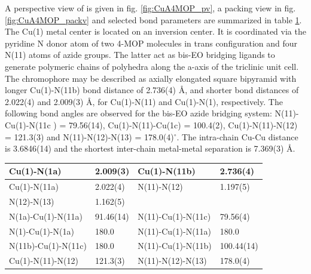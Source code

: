 A perspective view of  is given in fig. \ref{fig:CuA4MOP_pv}, a packing view in fig. \ref{fig:CuA4MOP_packv} and selected bond parameters are summarized in table \ref{batab:CuA4MOP}. The Cu(1) metal center is located on an inversion center. It is coordinated via the pyridine N donor atom of two 4-MOP molecules in trans configuration and four N(11) atoms of azide groups. The latter act as bis-EO bridging ligands to generate polymeric chains of polyhedra along the a-axis of the triclinic unit cell. The  chromophore may be described as axially elongated square bipyramid with longer Cu(1)-N(11b) bond distance of 2.736(4) \AA, and shorter bond distances of 2.022(4) and 2.009(3) \AA, for Cu(1)-N(11) and Cu(1)-N(1), respectively. The following bond angles are observed for the bis-EO azide bridging system: N(11)-Cu(1)-N(11c ) = 79.56(14), Cu(1)-N(11)-Cu(1c) = 100.4(2), Cu(1)-N(11)-N(12) = 121.3(3) and N(11)-N(12)-N(13) = 178.0(4)$^\circ$. The intra-chain Cu-Cu distance is 3.6846(14) and the shortest inter-chain metal-metal separation is 7.369(3) \AA.
\renewcommand{\arraystretch}{1.3}

\begin{table}[ htpb!]
\centering
{}
\begin{tabular}{|l|l|l|l|}
\hline
Cu(1)-N(1a) & 2.009(3) & Cu(1)-N(11b) & 2.736(4)\\
\hline
Cu(1)-N(11a) & 2.022(4) & N(11)-N(12) & 1.197(5)\\
\hline
N(12)-N(13) & 1.162(5) &  & \\
\hline
\hline
N(1a)-Cu(1)-N(11a) & 91.46(14) & N(11)-Cu(1)-N(11c) & 79.56(4)\\
\hline
N(1)-Cu(1)-N(1a) & 180.0 & N(11)-Cu(1)-N(11a) & 180.0\\
\hline
N(11b)-Cu(1)-N(11c) & 180.0 & N(11)-Cu(1)-N(11b) & 100.44(14)\\
\hline
Cu(1)-N(11)-N(12) & 121.3(3) & N(11)-N(12)-N(13) & 178.0(4)\\
\hline
\end{tabular}
\label{batab:CuA4MOP}
\end{table}



